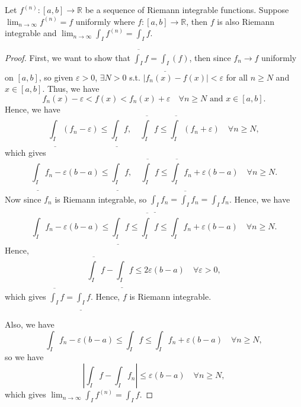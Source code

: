 \begin{theorem} \label{thm: uniformly conv preserve Riemann integrable}
    Let \(f^{(n)}: [a, b] \to \mathbb{R} \) be a sequence of Riemann integrable functions. Suppose \(\lim_{n \to \infty} f^{(n)} = f \) uniformly where \(f: [a, b] \to \mathbb{R} \), then \(f\) is also Riemann integrable and \(\lim_{n \to \infty} \int _I f^{(n)} = \int _I f\). 
\end{theorem}
\begin{proof}
    First, we want to show that  \(\overline{\int _I}f = \underline{\int _I}(f) \), then since \(f_n \to f\) uniformly on \([a, b]\), so given \(\varepsilon > 0\), \(\exists N > 0\) s.t. \(\left\vert f_n(x) - f(x) \right\vert < \varepsilon  \) for all \(n \ge N\) and \(x \in [a, b]\). Thus, we have 
    \[
        f_n(x) - \varepsilon < f(x) < f_n(x) + \varepsilon \quad \forall n \ge N \text{ and } x \in [a, b].
    \]      
    Hence, we have 
    \[
        \underline{\int _I} (f_n - \varepsilon ) \le \underline{\int _I} f, \quad \overline{\int _I} f \le \overline{\int _I} (f_n + \varepsilon ) \quad \forall n \ge N, 
    \]  which gives 
    \[
        \underline{\int _I} f_n - \varepsilon (b - a) \le \underline{\int _I} f, \quad \overline{\int _I} f \le \overline{\int _I} f_n + \varepsilon (b - a) \quad \forall n \ge N.  
    \] Now since \(f_n\) is Riemann integrable, so \(\underline{\int _I} f_n = \overline{\int _I} f_n = \int _I f_n \). Hence, we have 
    \[
        \int_I f_n - \varepsilon (b - a) \le \underline{\int _I} f \le \overline{\int _I} f \le \int _I f_n + \varepsilon (b - a) \quad \forall n \ge N.
    \] 
    Hence, 
    \[
        \overline{\int _I} f - \underline{\int _I} f \le 2 \varepsilon (b - a) \quad \forall \varepsilon > 0,
    \] which gives \(\overline{\int _I} f = \underline{\int _I} f \). Hence, \(f\) is Riemann integrable. 
    
    Also, we have 
    \[
       \int_I f_n - \varepsilon (b - a) \le \int _I f \le \int _I f_n + \varepsilon (b - a) \quad \forall n \ge N,
    \] so we have 
    \[
        \left\vert \int _I f - \int _I f_n \right\vert \le \varepsilon (b - a) \quad \forall n \ge N, 
    \] which gives \(\lim_{n \to \infty} \int _I f^{(n)} = \int _I f \). 
\end{proof}

